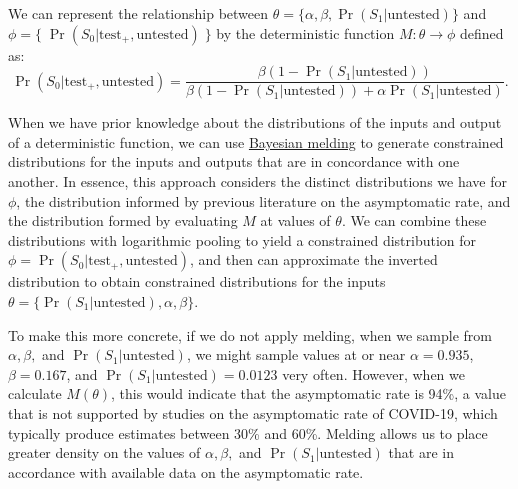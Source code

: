 \documentclass[12pt,twoside]{smiththesis}
\begin{document}
We can represent the relationship between \(\theta = \{ \alpha, \beta, \Pr(S_1|\text{untested})\}\) and \(\phi = \{\; \Pr(S_0|\text{test}_+, \text{untested})\;\}\) by the deterministic function
\(M: \theta \to \phi\) defined as:
\[\Pr(S_0|\text{test}_+, \text{untested}) = \dfrac{\beta(1 - \Pr(S_1|\text{untested}))}{\beta(1-\Pr(S_1|\text{untested})) + \alpha \Pr(S_1|\text{untested})}.\]

When we have prior knowledge about the distributions of the inputs and output of a deterministic function, we can use \protect\hyperlink{meld}{Bayesian melding} to generate constrained distributions for the inputs and outputs that are in concordance with one another. In essence, this approach considers the distinct distributions we have for \(\phi\), the distribution informed by previous literature on the asymptomatic rate, and the distribution formed by evaluating \(M\) at values of \(\theta\). We can combine these distributions with logarithmic pooling to yield a constrained distribution for \(\phi=\Pr(S_0|\text{test}_+, \text{untested})\), and then can approximate the inverted distribution to obtain constrained distributions for the inputs \(\theta = \{\Pr(S_1|\text{untested}), \alpha, \beta \}\).

To make this more concrete, if we do not apply melding, when we sample from \(\alpha, \beta,\) and \(\Pr(S_1|\text{untested})\), we might sample values at or near \(\alpha = 0.935\), \(\beta = 0.167\), and \(\Pr(S_1|\text{untested} ) = 0.0123\) very often. However, when we calculate \(M(\theta)\), this would indicate that the asymptomatic rate is 94\%, a value that is not supported by studies on the asymptomatic rate of COVID-19, which typically produce estimates between 30\% and 60\%. Melding allows us to place greater density on the values of \(\alpha, \beta,\) and \(\Pr(S_1|\text{untested})\) that are in accordance with available data on the asymptomatic rate.
\end{document}
